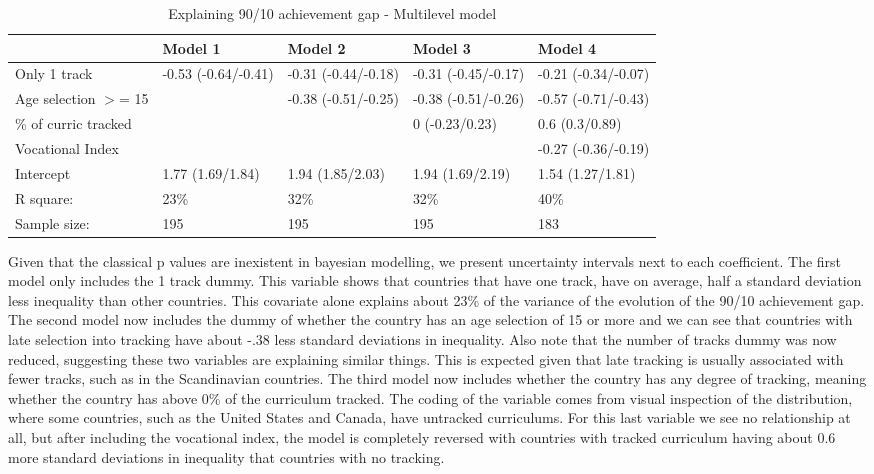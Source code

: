 \documentclass[11pt, a4paper]{article}\usepackage[]{graphicx}\usepackage[]{color}
\begin{document}
\begin{table}[ht]
\centering
\begin{tabular}{lllll}
  \hline
  & Model 1 & Model 2 & Model 3 & Model 4 \\ 
  \hline
Only 1 track & -0.53 (-0.64/-0.41) & -0.31 (-0.44/-0.18) & -0.31 (-0.45/-0.17) & -0.21 (-0.34/-0.07) \\ 
  Age selection $>$= 15 &  & -0.38 (-0.51/-0.25) & -0.38 (-0.51/-0.26) & -0.57 (-0.71/-0.43) \\ 
  \% of curric tracked &  &  & 0 (-0.23/0.23) & 0.6 (0.3/0.89) \\ 
  Vocational Index &  &  &  & -0.27 (-0.36/-0.19) \\ 
  Intercept & 1.77 (1.69/1.84) & 1.94 (1.85/2.03) & 1.94 (1.69/2.19) & 1.54 (1.27/1.81) \\ 
   \hline R square: & 23\% & 32\% & 32\% & 40\% \\ Sample size: & 195 & 195 & 195 & 183 \\ \hline \hline
\end{tabular}
\caption{Explaining 90/10 achievement gap - Multilevel model} 
\end{table}


Given that the classical p values are inexistent in bayesian modelling, we present uncertainty intervals next to each coefficient. The first model only includes the 1 track dummy. This variable shows that countries that have one track, have on average, half a standard deviation less inequality than other countries. This covariate alone explains about 23\% of the variance of the evolution of the 90/10 achievement gap. The second model now includes the dummy of whether the country has an age selection of 15 or more and we can see that countries with late selection into tracking have about -.38 less standard deviations in inequality. Also note that the number of tracks dummy was now reduced, suggesting these two variables are explaining similar things. This is expected given that late tracking is usually associated with fewer tracks, such as in the Scandinavian countries. The third model now includes whether the country has any degree of tracking, meaning whether the country has above 0\% of the curriculum tracked. The coding of the variable comes from visual inspection of the distribution, where some countries, such as the United States and Canada, have untracked curriculums. For this last variable we see no relationship at all, but after including the vocational index, the model is completely reversed with countries with tracked curriculum having about 0.6 more standard deviations in inequality that countries with no tracking.
\end{document}
